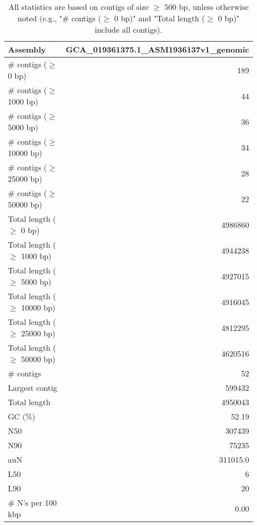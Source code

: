 \documentclass[12pt,a4paper]{article}
\begin{document}
\begin{table}[ht]
\begin{center}
\caption{All statistics are based on contigs of size $\geq$ 500 bp, unless otherwise noted (e.g., "\# contigs ($\geq$ 0 bp)" and "Total length ($\geq$ 0 bp)" include all contigs).}
\begin{tabular}{|l*{1}{|r}|}
\hline
Assembly & GCA\_019361375.1\_ASM1936137v1\_genomic \\ \hline
\# contigs ($\geq$ 0 bp) & 189 \\ \hline
\# contigs ($\geq$ 1000 bp) & 44 \\ \hline
\# contigs ($\geq$ 5000 bp) & 36 \\ \hline
\# contigs ($\geq$ 10000 bp) & 34 \\ \hline
\# contigs ($\geq$ 25000 bp) & 28 \\ \hline
\# contigs ($\geq$ 50000 bp) & 22 \\ \hline
Total length ($\geq$ 0 bp) & 4986860 \\ \hline
Total length ($\geq$ 1000 bp) & 4944238 \\ \hline
Total length ($\geq$ 5000 bp) & 4927015 \\ \hline
Total length ($\geq$ 10000 bp) & 4916045 \\ \hline
Total length ($\geq$ 25000 bp) & 4812295 \\ \hline
Total length ($\geq$ 50000 bp) & 4620516 \\ \hline
\# contigs & 52 \\ \hline
Largest contig & 599432 \\ \hline
Total length & 4950043 \\ \hline
GC (\%) & 52.19 \\ \hline
N50 & 307439 \\ \hline
N90 & 75235 \\ \hline
auN & 311015.0 \\ \hline
L50 & 6 \\ \hline
L90 & 20 \\ \hline
\# N's per 100 kbp & 0.00 \\ \hline
\end{tabular}
\end{center}
\end{table}
\end{document}
